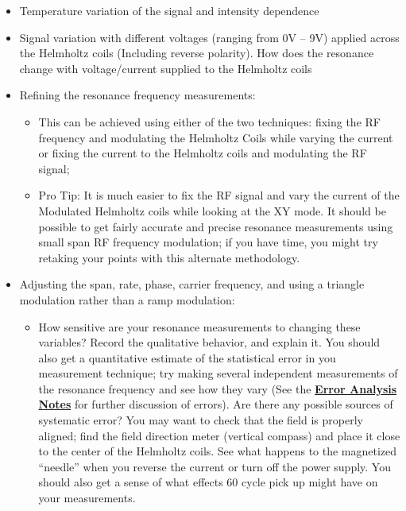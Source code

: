 \documentclass{../lab}
\begin{document}
\begin{itemize}
    \item Temperature variation of the signal and intensity dependence

    \item Signal variation with different voltages (ranging from 0V -- 9V) applied across the Helmholtz coils (Including reverse polarity). How does the resonance change with voltage/current supplied to the Helmholtz coils

    \item Refining the resonance frequency measurements:
    \begin{itemize}
        \item This can be achieved using either of the two techniques: fixing the RF frequency and modulating the Helmholtz Coils while varying the current or fixing the current to the Helmholtz coils and modulating the RF signal;

        \item Pro Tip: It is much easier to fix the RF signal and vary the current of the Modulated Helmholtz coils while looking at the XY mode. It should be possible to get fairly accurate and precise resonance measurements using small span RF frequency modulation; if you have time, you might try retaking your points with this alternate methodology.
    \end{itemize}
    \item Adjusting the span, rate, phase, carrier frequency, and using a triangle modulation rather than a ramp modulation:
    \begin{itemize}
        \item How sensitive are your resonance measurements to changing these variables? Record the qualitative behavior, and explain it. You should also get a quantitative estimate of the statistical error in you measurement technique; try making several independent measurements of the resonance frequency and see how they vary (See the \href{\ErrorAnalysisNotes}{\textbf{Error Analysis Notes}} for further discussion of errors). Are there any possible sources of systematic error? You may want to check that the field is properly aligned; find the field direction meter (vertical compass) and place it close to the center of the Helmholtz coils. See what happens to the magnetized ``needle'' when you reverse the current or turn off the power supply. You should also get a sense of what effects 60 cycle pick up might have on your measurements.

    \end{itemize}
    

\end{itemize}
\end{document}
